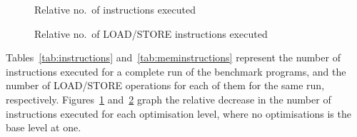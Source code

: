 \begin{figure}
  \caption{Relative no.\ of instructions executed}\label{fig:relativeinstructions}
\end{figure}

\begin{figure}
  \caption{Relative no.\ of LOAD/STORE instructions executed}\label{fig:relativememinstructions}
\end{figure}

Tables~\ref{tab:instructions} and~\ref{tab:meminstructions} represent the number
of instructions executed for a complete run of the benchmark programs, and the
number of LOAD/STORE operations for each of them for the same run, respectively.
Figures~\ref{fig:relativeinstructions} and~\ref{fig:relativememinstructions}
graph the relative decrease in the number of instructions executed for each
optimisation level, where no optimisations is the base level at one.

